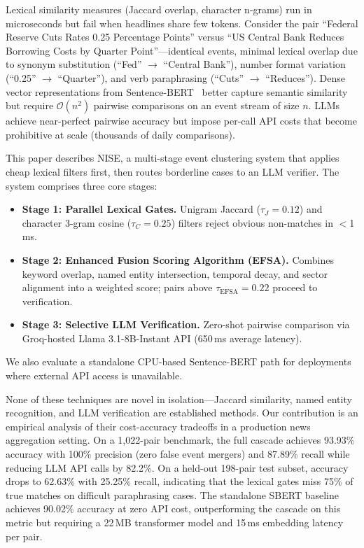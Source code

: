 \documentclass[conference]{IEEEtran}
\begin{document}
Lexical similarity measures (Jaccard overlap, character n-grams) run in microseconds but fail when headlines share few tokens.
Consider the pair ``Federal Reserve Cuts Rates 0.25 Percentage Points'' versus ``US Central Bank Reduces Borrowing Costs by Quarter Point''---identical events, minimal lexical overlap due to synonym substitution (``Fed'' $\to$ ``Central Bank''), number format variation (``0.25'' $\to$ ``Quarter''), and verb paraphrasing (``Cuts'' $\to$ ``Reduces'').
Dense vector representations from Sentence-BERT~\cite{reimers2019sentence} better capture semantic similarity but require $\mathcal{O}(n^2)$ pairwise comparisons on an event stream of size $n$.
LLMs achieve near-perfect pairwise accuracy but impose per-call API costs that become prohibitive at scale (thousands of daily comparisons).

This paper describes NISE, a multi-stage event clustering system that applies cheap lexical filters first, then routes borderline cases to an LLM verifier.
The system comprises three core stages:
\begin{itemize}
    \item \textbf{Stage 1: Parallel Lexical Gates.} Unigram Jaccard ($\tau_J = 0.12$) and character 3-gram cosine ($\tau_C = 0.25$) filters reject obvious non-matches in $<$1\,ms.
    \item \textbf{Stage 2: Enhanced Fusion Scoring Algorithm (EFSA).} Combines keyword overlap, named entity intersection, temporal decay, and sector alignment into a weighted score; pairs above $\tau_{\text{EFSA}} = 0.22$ proceed to verification.
    \item \textbf{Stage 3: Selective LLM Verification.} Zero-shot pairwise comparison via Groq-hosted Llama 3.1-8B-Instant API (650\,ms average latency).
\end{itemize}

We also evaluate a standalone CPU-based Sentence-BERT path for deployments where external API access is unavailable.

None of these techniques are novel in isolation---Jaccard similarity, named entity recognition, and LLM verification are established methods.
Our contribution is an empirical analysis of their cost-accuracy tradeoffs in a production news aggregation setting.
On a 1,022-pair benchmark, the full cascade achieves 93.93\% accuracy with 100\% precision (zero false event mergers) and 87.89\% recall while reducing LLM API calls by 82.2\%.
On a held-out 198-pair test subset, accuracy drops to 62.63\% with 25.25\% recall, indicating that the lexical gates miss 75\% of true matches on difficult paraphrasing cases.
The standalone SBERT baseline achieves 90.02\% accuracy at zero API cost, outperforming the cascade on this metric but requiring a 22\,MB transformer model and 15\,ms embedding latency per pair.
\end{document}
